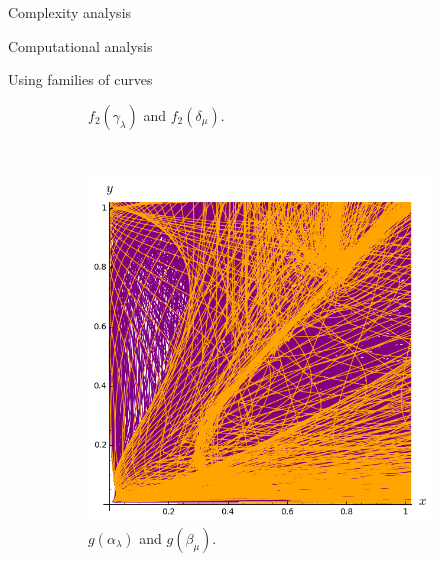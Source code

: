\documentclass[11pt, a4paper, english, twoside, notitlepage, openright]{report}
\begin{document}
\begin{chapter}{Complexity analysis}
\begin{section}{Computational analysis}
\begin{subsection}{Using families of curves}
\begin{figure}
\begin{subfigure}{.45\linewidth}
\vspace{-0.4cm}\caption{$f_2(\gamma_{\lambda})$ and $f_2(\delta_{\mu})$.\label{fig:3curves1}}
\end{subfigure}\\[1ex]
\vspace{-0.2cm}
	
\hspace{0.4cm}
\begin{subfigure}{.45\linewidth}\centering
\includegraphics[width=1\textwidth]{plots/ch5_24_1curves2.png}
\vspace{-0.4cm}\caption{$g(\alpha_{\lambda})$ and $g(\beta_{\mu})$.\label{fig:1curves2}}
\end{subfigure}
\begin{subfigure}{.45\linewidth}\centering

\end{subfigure}
\end{figure}
\end{subsection}
\end{section}
\end{chapter}
\end{document}
